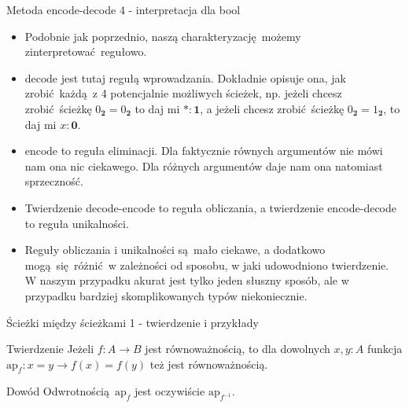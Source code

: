 \documentclass{beamer}
\newcommand{\finv}[1]{#1^{-1}}
\newcommand{\encode}{\text{encode}}
\newcommand{\decode}{\text{decode}}
\begin{document}
\begin{frame}{Metoda encode-decode 4 - interpretacja dla bool}
\begin{itemize}
	\item Podobnie jak poprzednio, naszą charakteryzację możemy zinterpretować regułowo.
	\item $\decode$ jest tutaj regułą wprowadzania. Dokładnie opisuje ona, jak zrobić każdą z 4 potencjalnie możliwych ścieżek, np. jeżeli chcesz zrobić ścieżkę $0_{\textbf{2}} = 0_{\textbf{2}}$ to daj mi $* : \textbf{1}$, a jeżeli chcesz zrobić ścieżkę $0_{\textbf{2}} = 1_{\textbf{2}}$, to daj mi $x : \textbf{0}$.
	\item $\encode$ to reguła eliminacji. Dla faktycznie równych argumentów nie mówi nam ona nic ciekawego. Dla różnych argumentów daje nam ona natomiast sprzeczność.
	\item Twierdzenie decode-encode to reguła obliczania, a twierdzenie encode-decode to reguła unikalności.
	\item Reguły obliczania i unikalności są mało ciekawe, a dodatkowo mogą się różnić w zależności od sposobu, w jaki udowodniono twierdzenie. W naszym przypadku akurat jest tylko jeden słuszny sposób, ale w przypadku bardziej skomplikowanych typów niekoniecznie.
\end{itemize}
\end{frame}

\begin{frame}{Ścieżki między ścieżkami 1 - twierdzenie i przykłady}

\begin{block}{Twierdzenie}
Jeżeli $f : A \to B$ jest równoważnością, to dla dowolnych $x, y : A$ funkcja $\text{ap}_f : x = y \to f(x) = f(y)$ też jest równoważnością.
\end{block}

\begin{block}{Dowód}
Odwrotnością $\text{ap}_f$ jest oczywiście $\text{ap}_{\finv{f}}$.
\end{block}


\end{frame}
\end{document}
